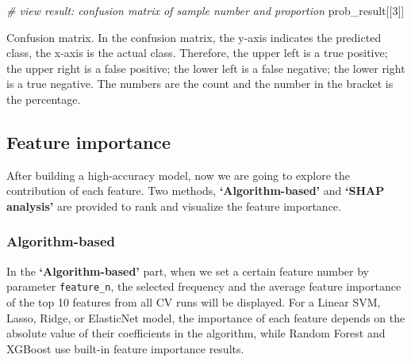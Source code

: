 \documentclass[]{article}
\newcommand{\hlnum}[1]{\textcolor[rgb]{0.816,0.125,0.439}{#1}}%
\newcommand{\hlcom}[1]{\textcolor[rgb]{0.502,0.502,0.502}{\textit{#1}}}%
\newcommand{\hlstd}[1]{\textcolor[rgb]{0.251,0.251,0.251}{#1}}%
\newenvironment{Shaded}{\begin{myshaded}}{\end{myshaded}}
\newcommand{\DecValTok}[1]{\hlnum{#1}}
\newcommand{\CommentTok}[1]{\hlcom{#1}}
\newcommand{\NormalTok}[1]{\hlstd{#1}}
\begin{document}
\begin{Shaded}
\begin{Highlighting}[]
\CommentTok{# view result: confusion matrix of sample number and proportion}
\NormalTok{prob_result[[}\DecValTok{3}\NormalTok{]]        }
\end{Highlighting}
\end{Shaded}

\label{fig:unnamed-chunk-61}Confusion matrix. In the confusion matrix, the y-axis indicates the predicted class, the x-axis is the actual class. Therefore, the upper left is a true positive; the upper right is a false positive; the lower left is a false negative; the lower right is a true negative. The numbers are the count and the number in the bracket is the percentage.

\hypertarget{subsec:feature_im}{%
\subsection{Feature importance}\label{subsec:feature_im}}

After building a high-accuracy model, now we are going to explore the contribution of each feature. Two methods, \textbf{`Algorithm-based'} and \textbf{`SHAP analysis'} are provided to rank and visualize the feature importance.

\hypertarget{algorithm-based}{%
\subsubsection{Algorithm-based}\label{algorithm-based}}

In the \textbf{`Algorithm-based'} part, when we set a certain feature number by parameter \texttt{feature\_n}, the selected frequency and the average feature importance of the top 10 features from all CV runs will be displayed. For a Linear SVM, Lasso, Ridge, or ElasticNet model, the importance of each feature depends on the absolute value of their coefficients in the algorithm, while Random Forest and XGBoost use built-in feature importance results.
\end{document}
